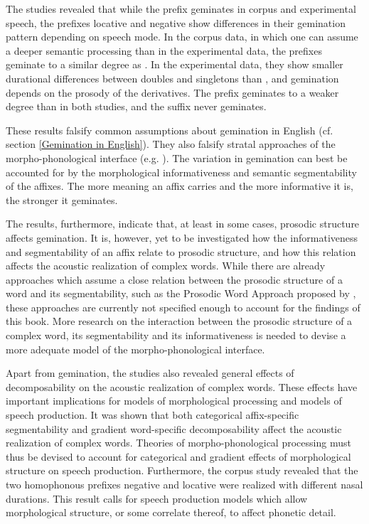  
The studies revealed that while the prefix  geminates in corpus and experimental speech, the prefixes locative  and negative  show differences in their gemination pattern depending on speech mode. In the corpus data, in which one can assume a deeper semantic processing than in the experimental data, the prefixes geminate to a similar degree as . In the experimental data, they show smaller durational differences between doubles and singletons than , and gemination depends on the prosody of the derivatives. The prefix  geminates to a weaker degree than  in both studies, and the suffix   never geminates.

These results falsify common assumptions about gemination in English (cf. section \ref{Gemination in English}). They also falsify stratal approaches of the morpho-phonological interface (e.g. \citealt{Kiparsky.1982,Kiparsky.1985,Mohanan.1986,BermudezOtero.2012,Kiparsky.2015,BermudezOtero.2017}). 
The variation in gemination can best be accounted for by the morphological informativeness and semantic segmentability of the affixes. The more meaning an affix carries and the more informative it is, the stronger it geminates. 

The results, furthermore, indicate that, at least in some cases, prosodic structure affects gemination. It is, however, yet to be investigated how the informativeness and segmentability of an affix relate to prosodic structure, and how this relation affects the acoustic realization of complex words. 
While there are already approaches which assume a close relation between the prosodic structure of a word and its segmentability, such as the Prosodic Word Approach proposed by \cite{Raffelsiefen.1999}, these approaches are currently not specified enough to account for the findings of this book.  More research on the interaction between the prosodic structure of a complex word, its segmentability and its  informativeness is needed to devise a more adequate model of the morpho-phonological interface.

Apart from gemination, the studies also revealed general effects of decomposability on the acoustic realization of complex words. These effects have important implications for models of morphological processing and models of speech production. It was shown that both categorical affix-specific segmentability and gradient word-specific decomposability affect the acoustic realization of complex words. Theories of morpho-phonological processing must thus be devised to account for categorical and gradient effects of morphological structure on speech production.
Furthermore, the corpus study revealed that the two homophonous prefixes negative  and locative  were realized with different nasal durations. This result calls for speech production models which allow morphological structure, or some correlate thereof, to affect phonetic detail. 

